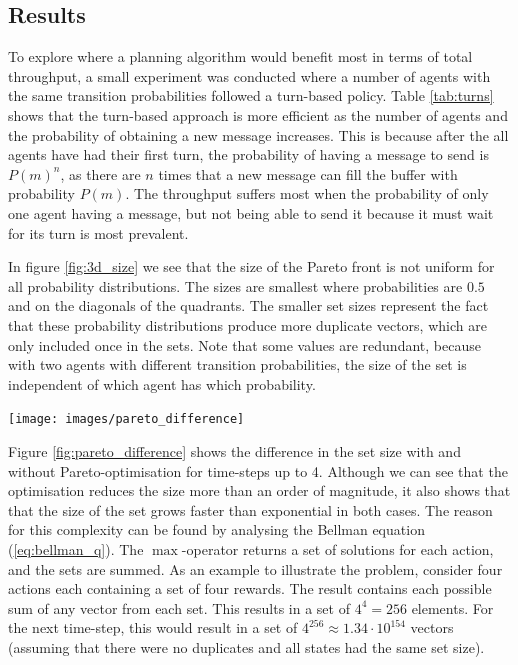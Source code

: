 \documentclass{article}
\makeatletter
\newenvironment{figurehere}
{\def\@captype{figure}}
{}
\makeatother
\begin{document}
	\begin{multicols}{2}
	\section{Results}
	\label{sec:results}
	To explore where a planning algorithm would benefit most in terms of total
	throughput, a small experiment was conducted where a number of agents with
	the same transition probabilities followed a turn-based policy.
	Table \ref{tab:turns} shows that the turn-based approach is more efficient
	as the number of agents and the probability of obtaining a new message
	increases. This is because after the all agents have had their first turn,
	the probability of having a message to send is $P(m)^n$, as there are
	$n$ times that a new message can fill the buffer with probability $P(m)$.
	The throughput suffers most when the probability of only one agent having a
	message, but not being able to send it because it must wait for its turn is
	most prevalent.

	In figure \ref{fig:3d_size} we see that the size of the Pareto front is not
	uniform for all probability distributions. The sizes are smallest where
	probabilities are $0.5$ and on the diagonals of the quadrants. The
	smaller set sizes represent the fact that these probability distributions
	produce more duplicate vectors, which are only included once in the sets.
	Note that some values are redundant, because with two agents with different
	transition probabilities, the size of the set is independent of which agent
	has which probability.

	\vspace{.5cm}
	\begin{figurehere}
		\centering
		\texttt{[image: images/pareto\_difference]}
	   \label{fig:pareto_difference}
	\end{figurehere}
	\vspace{0.5cm}

	Figure \ref{fig:pareto_difference} shows the difference in the set size with
	and without Pareto-optimisation for time-steps up to 4. Although we can see
	that the optimisation reduces the size more than an order of magnitude, it
	also shows that that the size of the set grows faster than exponential in
	both cases.
	The reason for this complexity can be found by analysing the Bellman
	equation (\ref{eq:bellman_q}). The $\max$-operator returns a set of
	solutions for each action, and the sets are summed. As an example to
	illustrate the problem, consider four actions each containing a set of four
	rewards. The result contains each possible sum of any vector from each set.
	This results in a set of $4^4=256$ elements. For the next time-step, this
	would result in a set of $4^{256}\approx 1.34\cdot 10^{154}$ vectors
	(assuming that there were no duplicates and all states had the same set
	size).


\end{multicols}
\end{document}
